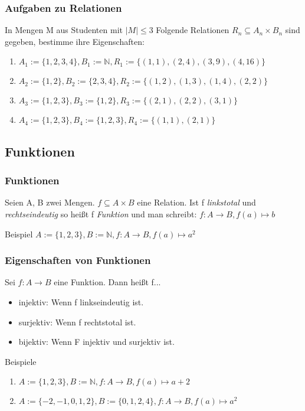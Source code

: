 \begin{frame}
  \frametitle{Aufgaben zu Relationen}
  \begin{exampleblock}{In Mengen M aus Studenten mit $|M| \leq 3$}
      Folgende Relationen $R_n \subseteq A_n \times B_n$ sind gegeben, bestimme ihre Eigenschaften:
      \begin{enumerate}
        \item $A_1 := \{1, 2, 3, 4\}, B_1 := \mathbb{N}, R_1 := \{(1, 1), (2, 4), (3, 9), (4, 16)\}$
        \item $A_2 := \{1, 2\}, B_2 := \{2, 3, 4\}, R_2 := \{(1, 2), (1, 3), (1, 4), (2, 2)\}$
        \item $A_3 := \{1, 2, 3\}, B_3 := \{1, 2\}, R_3 := \{(2, 1), (2, 2), (3, 1)\}$
        \item $A_4 := \{1, 2, 3\}, B_4 := \{1, 2, 3\}, R_4 := \{(1, 1), (2, 1)\}$
      \end{enumerate}
  \end{exampleblock}
\end{frame}
\subsection{Funktionen}
\begin{frame}
  \frametitle{Funktionen}
  \begin{definition}
  	Seien A, B zwei Mengen. $f \subseteq A \times B$ eine Relation. Ist f \emph{linkstotal} und \emph{rechtseindeutig} so heißt f \emph{Funktion} und man schreibt:
  	$f: A \rightarrow B, f(a) \mapsto b$
  \end{definition} \pause
  \begin{exampleblock}{Beispiel}
      $A := \{1, 2, 3\}, B := \mathbb{N}, f: A \rightarrow B, f(a) \mapsto a^2$
  \end{exampleblock}
\end{frame}
\begin{frame}
  \frametitle{Eigenschaften von Funktionen}
  \begin{definition}
  	Sei $f: A \rightarrow B$ eine Funktion. Dann heißt f...
  	\begin{itemize}
  	  \item injektiv: Wenn f linkseindeutig ist.
  	  \item surjektiv: Wenn f rechtstotal ist.
  	  \item bijektiv: Wenn F injektiv und surjektiv ist.
  	\end{itemize}
  \end{definition} \pause
  \begin{exampleblock}{Beispiele}
    \begin{enumerate}
      \item $A := \{1, 2, 3\}, B := \mathbb{N}, f: A \rightarrow B, f(a) \mapsto a+2$
      \item $A := \{-2, -1, 0, 1, 2\}, B := \{0, 1, 2, 4\}, f: A \rightarrow B, f(a) \mapsto a^2$
    \end{enumerate}
  \end{exampleblock}
\end{frame}

